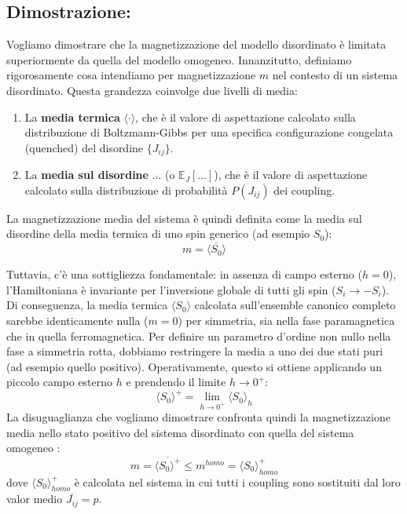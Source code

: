 \subsection{Dimostrazione:}

Vogliamo dimostrare che la magnetizzazione del modello disordinato è limitata superiormente da quella del modello omogeneo.
Innanzitutto, definiamo rigorosamente cosa intendiamo per magnetizzazione $m$ nel contesto di un sistema disordinato. Questa grandezza coinvolge due livelli di media:
\begin{enumerate}
    \item La \textbf{media termica} $\langle \cdot \rangle$, che è il valore di aspettazione calcolato sulla distribuzione di Boltzmann-Gibbs per una specifica configurazione congelata (quenched) del disordine $\{J_{ij}\}$.
    \item La \textbf{media sul disordine} $\overline{\dots}$ (o $\mathbb{E}_J[\dots]$), che è il valore di aspettazione calcolato sulla distribuzione di probabilità $P(J_{ij})$ dei coupling.
\end{enumerate}

La magnetizzazione media del sistema è quindi definita come la media sul disordine della media termica di uno spin generico (ad esempio $S_0$):
\begin{equation}
m = \overline{\langle S_0 \rangle}
\end{equation}

\noindent Tuttavia, c'è una sottigliezza fondamentale: in assenza di campo esterno ($h=0$), l'Hamiltoniana è invariante per l'inversione globale di tutti gli spin ($S_i \to -S_i$). Di conseguenza, la media termica $\langle S_0 \rangle$ calcolata sull'ensemble canonico completo sarebbe identicamente nulla ($m=0$) per simmetria, sia nella fase paramagnetica che in quella ferromagnetica.
Per definire un parametro d'ordine non nullo nella fase a simmetria rotta, dobbiamo restringere la media a uno dei due stati puri (ad esempio quello positivo). Operativamente, questo si ottiene applicando un piccolo campo esterno $h$ e prendendo il limite $h \to 0^+$:
\begin{equation}
\langle S_0 \rangle^+ = \lim_{h \to 0^+} \langle S_0 \rangle_h
\end{equation}
La disuguaglianza che vogliamo dimostrare confronta quindi la magnetizzazione media nello stato positivo del sistema disordinato con quella del sistema omogeneo :
\begin{equation}
m = \overline{\langle S_0 \rangle^+} \le m^{homo} = \langle S_0 \rangle^+_{homo}
\end{equation}
dove $\langle S_0 \rangle^+_{homo}$ è calcolata nel sistema in cui tutti i coupling sono sostituiti dal loro valor medio $\overline{J_{ij}} = p$.

